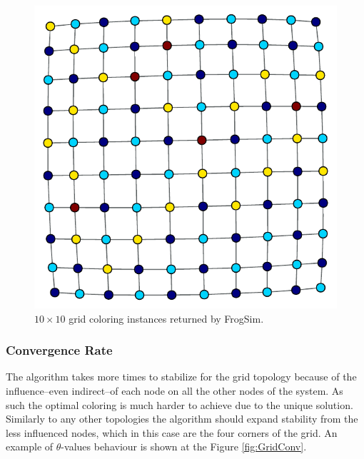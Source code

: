 \documentclass[letterpaper]{article}
\begin{document}
\begin{figure}[h]
\centering
\includegraphics[scale=0.5]{./Figures/grid-coloration.pdf}
\caption{$10 \times 10$ grid coloring instances returned by FrogSim.} \label{fig:GridColoration}
\end{figure}

\subsubsection{Convergence Rate}
The algorithm takes more times to stabilize for the grid topology because of the influence--even indirect--of each node on all the other nodes of the system. As such the optimal coloring is much harder to achieve due to the unique solution. Similarly to any other topologies the algorithm should expand stability from the less influenced nodes, which in this case are the four corners of the grid. An example of $\theta$-values behaviour is shown at the Figure \ref{fig:GridConv}.
\end{document}
